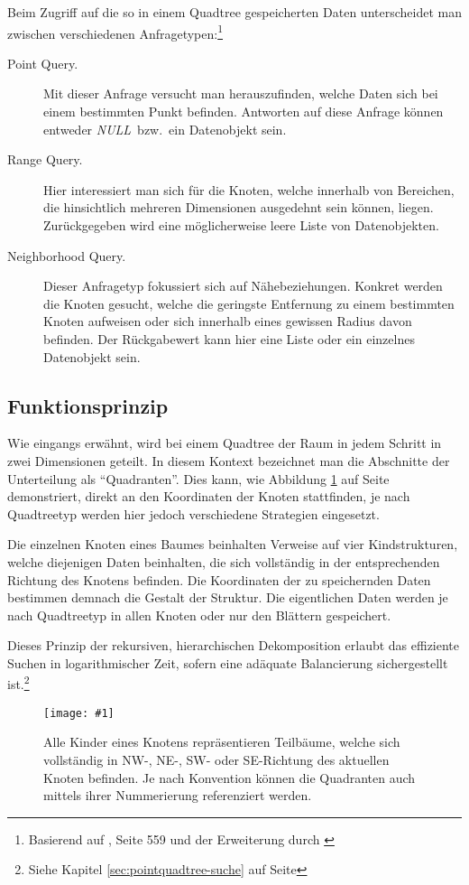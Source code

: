 \documentclass[%
			paper=a4,%
			DIV12,
			liststotoc,
			bibtotoc,
			draft=false,%
			titlepage
			]{scrartcl}
\newcommand{\mynull}{\textit{NULL}}
\newcommand{\myfig}[5] {
 \begin{figure}[tbph]
	 \centering
	 \texttt{[image: \#1]}
	 \caption[#4]{#5}
	 \label{fig:#2}
 \end{figure}
}
\begin{document}
Beim Zugriff auf die so in einem Quadtree gespeicherten Daten unterscheidet man zwischen verschiedenen Anfragetypen:\footnote{Basierend auf \cite{Knuth:1998:ACP:280635}, Seite 559 und der Erweiterung durch \cite{Bentley:1975:nearest}}
\begin{description}
	\item[Point Query.]
		Mit dieser Anfrage versucht man herauszufinden, welche Daten sich bei einem bestimmten Punkt befinden.
		Antworten auf diese Anfrage können entweder \mynull\ bzw.\ ein Datenobjekt sein.
	\item[Range Query.]
		Hier interessiert man sich für die Knoten, welche innerhalb von Bereichen, die hinsichtlich mehreren Dimensionen ausgedehnt sein können, liegen.
		Zurückgegeben wird eine möglicherweise leere Liste von Datenobjekten.
	\item[Neighborhood Query.]
		Dieser Anfragetyp fokussiert sich auf Nähebeziehungen.
		Konkret werden die Knoten gesucht, welche die geringste Entfernung zu einem bestimmten Knoten aufweisen oder sich innerhalb eines gewissen Radius davon befinden.
		Der Rückgabewert kann hier eine Liste oder ein einzelnes Datenobjekt sein.
\end{description}


\subsection{Funktionsprinzip}

Wie eingangs erwähnt, wird bei einem Quadtree der Raum in jedem Schritt in zwei Dimensionen geteilt.
In diesem Kontext bezeichnet man die Abschnitte der Unterteilung als "`Quadranten"'.
Dies kann, wie Abbildung \ref{fig:quadtree} auf Seite \pageref{fig:quadtree} demonstriert, direkt an den Koordinaten der Knoten stattfinden, je nach Quadtreetyp werden hier jedoch verschiedene Strategien eingesetzt.

Die einzelnen Knoten eines Baumes beinhalten Verweise auf vier Kindstrukturen, welche diejenigen Daten beinhalten, die sich vollständig in der entsprechenden Richtung des Knotens befinden. 
Die Koordinaten der zu speichernden Daten bestimmen demnach die Gestalt der Struktur.
Die eigentlichen Daten werden je nach Quadtreetyp in allen Knoten oder nur den Blättern gespeichert.

Dieses Prinzip der rekursiven, hierarchischen Dekomposition erlaubt das effiziente Suchen in logarithmischer Zeit, sofern eine adäquate Balancierung sichergestellt ist.\footnote{Siehe Kapitel \ref{sec:pointquadtree-suche} auf Seite \pageref{sec:pointquadtree-suche}}
\myfig{img/quadtree}{quadtree}{width=.4\textwidth}{Funktionsprinzip eines Quadtrees}{Alle Kinder eines Knotens repräsentieren Teilbäume, welche sich vollständig in NW-, NE-, \mbox{SW-} oder SE-Richtung des aktuellen Knoten befinden. Je nach Konvention können die Quadranten auch mittels ihrer Nummerierung referenziert werden.}
\end{document}
